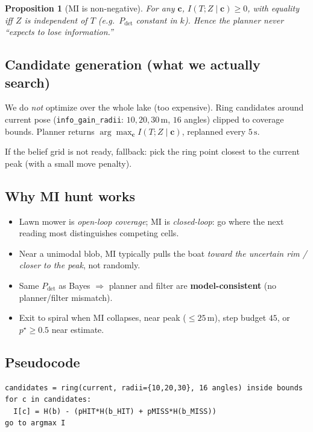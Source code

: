 \documentclass[11pt,a4paper]{article}
\newtheorem{proposition}{Proposition}
\begin{document}
\begin{proposition}[MI is non-negative]
For any \(\mathbf{c}\), \(I(T;Z\mid\mathbf{c})\ge 0\), with equality iff \(Z\)
is independent of \(T\) (e.g.\ \(P_{\mathrm{det}}\) constant in \(k\)). Hence
the planner never ``expects to lose information.''
\end{proposition}

\subsection{Candidate generation (what we actually search)}
We do \emph{not} optimize over the whole lake (too expensive). Ring candidates
around current pose (\texttt{info\_gain\_radii}: \(10,20,30\,\mathrm{m}\),
\(16\) angles) clipped to coverage bounds. Planner returns
\(\arg\max_{\mathbf{c}} I(T;Z\mid\mathbf{c})\), replanned every \(5\,\mathrm{s}\).

If the belief grid is not ready, fallback: pick the ring point closest to the
current peak (with a small move penalty).

\subsection{Why MI hunt works}
\begin{itemize}[leftmargin=*]
  \item Lawn mower is \emph{open-loop coverage}; MI is \emph{closed-loop}:
        go where the next reading most distinguishes competing cells.
  \item Near a unimodal blob, MI typically pulls the boat \emph{toward the
        uncertain rim / closer to the peak}, not randomly.
  \item Same \(P_{\mathrm{det}}\) as Bayes \(\Rightarrow\) planner and filter
        are \textbf{model-consistent} (no planner/filter mismatch).
  \item Exit to spiral when MI collapses, near peak (\(\le25\,\mathrm{m}\)),
        step budget \(45\), or \(p^{\star}\ge0.5\) near estimate.
\end{itemize}

\subsection{Pseudocode}
\begin{lstlisting}
candidates = ring(current, radii={10,20,30}, 16 angles) inside bounds
for c in candidates:
  I[c] = H(b) - (pHIT*H(b_HIT) + pMISS*H(b_MISS))
go to argmax I
\end{lstlisting}
\end{document}
